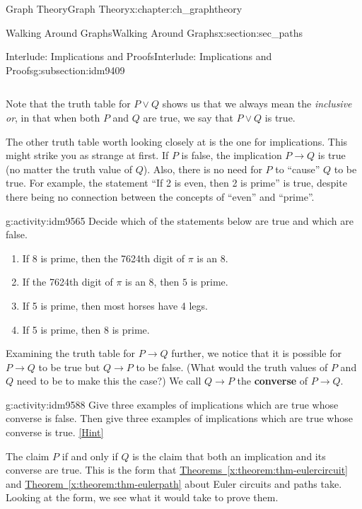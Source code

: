 \documentclass[oneside,10pt,]{book}
\newcommand{\terminology}[1]{\textbf{#1}}
\numberwithin{equation}{chapter}
\def\imp{\rightarrow}
\begin{document}
\begin{chapterptx}{Graph Theory}{}{Graph Theory}{}{}{x:chapter:ch_graphtheory}
\begin{sectionptx}{Walking Around Graphs}{}{Walking Around Graphs}{}{}{x:section:sec_paths}
\begin{subsectionptx}{Interlude: Implications and Proofs}{}{Interlude: Implications and Proofs}{}{}{g:subsection:idm9409}
\begin{sidebyside}{4}{0.025}{0.025}{0.05}
\begin{sbspanel}{0.2}
{\begin{tabular}{cBc}
\end{tabular}
\par}
\end{sbspanel}%
\end{sidebyside}%
\par
Note that the truth table for \(P \vee Q\) shows us that we always mean the \emph{inclusive or}, in that when both \(P\) and \(Q\) are true, we say that \(P \vee Q\) is true.%
\par
The other truth table worth looking closely at is the one for implications.  This might strike you as strange at first.  If \(P\) is false, the implication \(P \imp Q\) is true (no matter the truth value of \(Q\)).  Also, there is no need for \(P\) to ``cause'' \(Q\) to be true.  For example, the statement ``If 2 is even, then 2 is prime'' is true, despite there being no connection between the concepts of ``even'' and ``prime''.%
\begin{activity}{}{g:activity:idm9565}%
Decide which of the statements below are true and which are false.%
\begin{enumerate}[font=\bfseries,label=(\alph*),ref=\alph*]
\item{}If 8 is prime, then the 7624th digit of \(\pi\) is an 8.%
\item{}If the 7624th digit of \(\pi\) is an 8, then \(5\) is prime.%
\item{}If 5 is prime, then most horses have 4 legs.%
\item{}If 5 is prime, then 8 is prime.%
\end{enumerate}
\end{activity}
Examining the truth table for \(P \imp Q\) further, we notice that it is possible for \(P \imp Q\) to be true but \(Q \imp P\) to be false. (What would the truth values of \(P\) and \(Q\) need to be to make this the case?) We call \(Q \imp P\) the \terminology{converse} of \(P \imp Q\).%
\begin{activity}{}{g:activity:idm9588}%
Give three examples of implications which are true whose converse is false.  Then give three examples of implications which are true whose converse is true.%
\space\hspace*{0pt}\hfill{\tiny\hyperlink{g:hint:idm9591-back}{[Hint]}}\end{activity}
The claim \(P\) if and only if \(Q\) is the claim that both an implication and its converse are true.  This is the form that \hyperref[x:theorem:thm-eulercircuit]{Theorems~\ref{x:theorem:thm-eulercircuit}} and \hyperref[x:theorem:thm-eulerpath]{Theorem~\ref{x:theorem:thm-eulerpath}} about Euler circuits and paths take.  Looking at the form, we see what it would take to prove them.%

\end{subsectionptx}
\end{sectionptx}
\end{chapterptx}
\end{document}
